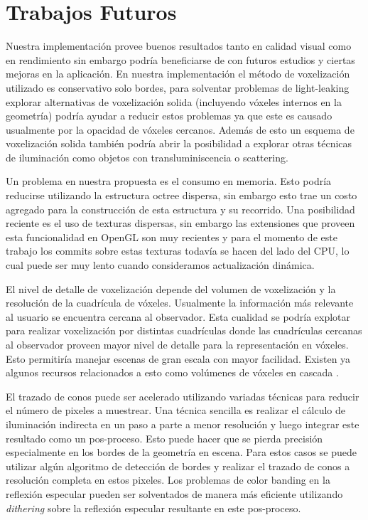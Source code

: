 \section{Trabajos Futuros} %
\label{sec:trabajos_futuros}
Nuestra implementación provee buenos resultados tanto en calidad visual como en rendimiento sin embargo podría beneficiarse de con futuros estudios y ciertas mejoras en la aplicación. En nuestra implementación el método de voxelización utilizado es conservativo solo bordes, para solventar problemas de light-leaking explorar alternativas de voxelización solida (incluyendo vóxeles internos en la geometría) podría ayudar a reducir estos problemas ya que este es causado usualmente por la opacidad de vóxeles cercanos. Además de esto un esquema de voxelización solida también podría abrir la posibilidad a explorar otras técnicas de iluminación como objetos con transluminiscencia o scattering.

Un problema en nuestra propuesta es el consumo en memoria. Esto podría reducirse utilizando la estructura octree dispersa, sin embargo esto trae un costo agregado para la construcción de esta estructura y su recorrido. Una posibilidad reciente es el uso de texturas dispersas, sin embargo las extensiones que proveen esta funcionalidad en OpenGL son muy recientes y para el momento de este trabajo los commits sobre estas texturas todavía se hacen del lado del CPU, lo cual puede ser muy lento cuando consideramos actualización dinámica.

El nivel de detalle de voxelización depende del volumen de voxelización y la resolución de la cuadrícula de vóxeles. Usualmente la información más relevante al usuario se encuentra cercana al observador. Esta cualidad se podría explotar para realizar voxelización por distintas cuadrículas donde las cuadrículas cercanas al observador proveen mayor nivel de detalle para la representación en vóxeles. Esto permitiría manejar escenas de gran escala con mayor facilidad. Existen ya algunos recursos relacionados a esto como volúmenes de vóxeles en cascada \cite{McLaren:2015:TCL:2775280.2792546}.

El trazado de conos puede ser acelerado utilizando variadas técnicas para reducir el número de pixeles a muestrear. Una técnica sencilla es realizar el cálculo de iluminación indirecta en un paso a parte a menor resolución y luego integrar este resultado como un pos-proceso. Esto puede hacer que se pierda precisión especialmente en los bordes de la geometría en escena. Para estos casos se puede utilizar algún algoritmo de detección de bordes y realizar el trazado de conos a resolución completa en estos pixeles. Los problemas de color banding en la reflexión especular pueden ser solventados de manera más eficiente utilizando \emph{dithering} sobre la reflexión especular resultante en este pos-proceso.
